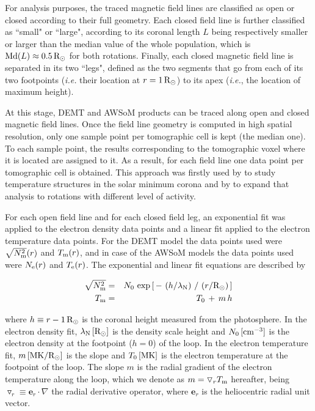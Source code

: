 \documentclass[namedreferences]{solarphysics}
\renewcommand{\l}{\lambda_{\rm N}}%
\newcommand{\mrsun}{{\rm R_\odot}}
\newcommand{\MK}{{\rm MK}}
\newcommand{\cm}{{\rm cm}}
\newcommand{\cminvc}{\cm^{-3}}
\newcommand{\dr}{\triangledown_r}
\newcommand{\er}{\mathbf{e}_r}
\newcommand{\Te}{T_{\rm e}}
\newcommand{\Tm}{T_{\rm m}}
\newcommand{\Ne}{N_{\rm e}}
\newcommand{\Nsqm}{N^2_{{\rm m}}}
\newcommand{\sqravgN}{\sqrt{\Nsqm}}
\begin{document}
\begin{article}
{For analysis purposes, {the traced magnetic field lines are classified as open or closed according to their full geometry. Each closed field} line is further classified as ``small" or ``large", according to its coronal length $L$ being {respectively smaller or larger than the median value of the whole population, which is ${\rm Md}(L)\approx 0.5\,\mrsun$ for both rotations.} Finally, each closed magnetic field line is separated in its two ``legs", defined as the two segments that go from each of its two footpoints (\textit{i.e.} their location at $r=1\,\mrsun$) to its apex (\textit{i.e.}, the location of maximum height).}

At this {stage, DEMT and AWSoM products} can be traced along open and closed magnetic field lines. Once the field line geometry is computed in high spatial resolution, only one sample point per tomographic cell is kept (the median one). To each sample point, the results corresponding to the tomographic voxel where it is located are assigned to it. As a result, for each field line one data point per tomographic cell {is obtained. This approach} was firstly used by \citet{huang_2012} to {study temperature} structures in the solar minimum {corona and by} \citet{nuevo_2013} to expand that analysis to rotations with different level of activity.

For each open field line and {for each closed field leg}, an exponential fit {was applied} to the electron density {data points} and a linear fit applied to the electron temperature {data points}. For {the DEMT model} the data points used were $\sqravgN(r)$ and $\Tm(r)$, and in case of {the AWSoM models} the data points used were $\Ne(r)$ and $\Te(r)$. The exponential and linear fit equations are described by

\begin{eqnarray}\label{Nfit}
\sqravgN &=& N_0\,\exp{\left[\,-\,\left(h/\l\right)\,/\,\left(r/\mrsun\right)\,\right]}\\
\label{Tfit}
\Tm &=& T_0\,+\,m\,h
\end{eqnarray}

\noindent
where $h \equiv r - 1\,\mrsun$ is the coronal height measured from the photosphere. In the electron density fit, $\l\,[\mrsun]$ is the density scale height and $N_0\,[\cminvc]$ is the electron density at the footpoint ($h=0$) of the loop. In the electron temperature fit, $m\,[\MK/\mrsun]$ is the slope and $T_0\,[\MK]$ is the electron temperature at the footpoint of the loop. The slope $m$ is the radial gradient of the electron temperature along the loop, which we denote as $m = \dr\Tm$ hereafter, being $\dr\equiv\er\cdot\nabla$ the radial derivative operator, where $\er$ is the heliocentric radial unit vector.


\end{article}
\end{document}
